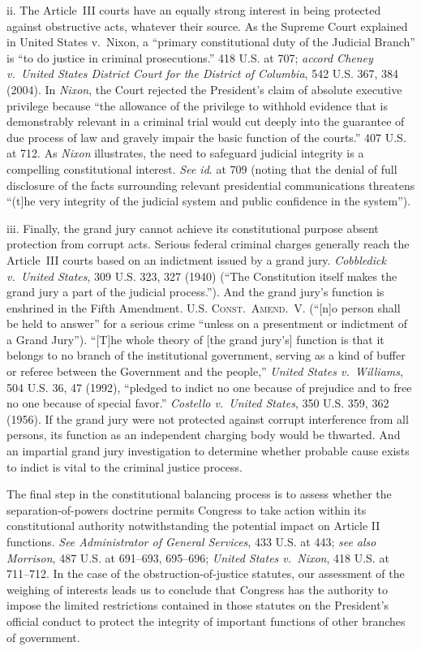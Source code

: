 ii. The Article~III courts have an equally strong interest in being protected against obstructive acts, whatever their source.
As the Supreme Court explained in United States v.\ Nixon, a ``primary constitutional duty of the Judicial Branch'' is ``to do justice in criminal prosecutions.'' 418 U.S. at 707;
\textit{accord Cheney v.\ United States District Court for the District of Columbia}, 542 U.S. 367, 384 (2004).
In \textit{Nixon}, the Court rejected the President's claim of absolute executive privilege because ``the allowance of the privilege to withhold evidence that is demonstrably relevant in a criminal trial would cut deeply into the guarantee of due process of law and gravely impair the basic function of the courts.'' 407 U.S. at 712.
As \textit{Nixon} illustrates, the need to safeguard judicial integrity is a compelling constitutional interest.
\textit{See id}. at 709 (noting that the denial of full disclosure of the facts surrounding relevant presidential communications threatens ``(t]he very integrity of the judicial system and public confidence in the system'').

iii. Finally, the grand jury cannot achieve its constitutional purpose absent protection from corrupt acts.
Serious federal criminal charges generally reach the Article~III courts based on an indictment issued by a grand jury.
\textit{Cobbledick v.\ United States}, 309 U.S. 323, 327 (1940) (``The Constitution itself makes the grand jury a part of the judicial process.'').
And the grand jury's function is enshrined in the Fifth Amendment.
\textsc{U.S. Const.\ Amend.~V}. (``[n]o person shall be held to answer'' for a serious crime ``unless on a presentment or indictment of a Grand Jury'').
``[T]he whole theory of [the grand jury's] function is that it belongs to no branch of the institutional government, serving as a kind of buffer or referee between the Government and the people,'' \textit{United States v.\ Williams}, 504 U.S. 36, 47 (1992), ``pledged to indict no one because of prejudice and to free no one because of special favor.''
\textit{Costello v.\ United States}, 350 U.S. 359, 362 (1956).
If the grand jury were not protected against corrupt interference from all persons, its function as an independent charging body would be thwarted.
And an impartial grand jury investigation to determine whether probable cause exists to indict is vital to the criminal justice process.

\hr

The final step in the constitutional balancing process is to assess whether the separation-of-powers doctrine permits Congress to take action within its constitutional authority notwithstanding the potential impact on Article II functions.
\textit{See Administrator of General Services}, 433 U.S. at 443;
\textit{see also Morrison}, 487 U.S. at 691--693, 695--696;
\textit{United States v.\ Nixon}, 418 U.S. at 711--712.
In the case of the obstruction-of-justice statutes, our assessment of the weighing of interests leads us to conclude that Congress has the authority to impose the limited restrictions contained in those statutes on the President's official conduct to protect the integrity of important functions of other branches of government.

